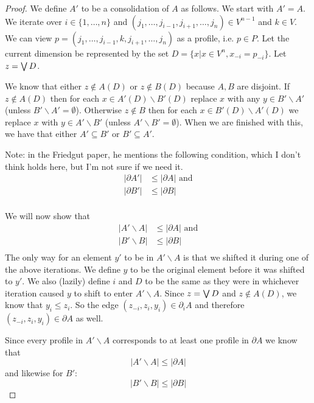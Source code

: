 	\begin{proof}
		We define $A'$ to be a consolidation of $A$ as follows. We start with $A' = A$. We iterate over $i \in \{1, \ldots, n\}$ and $(j_1, \ldots, j_{i-1}, j_{i+1}, \ldots, j_n) \in V^{n-1}$ and $k \in V$. We can view $p = (j_1, \ldots, j_{i-1}, k, j_{i+1}, \ldots, j_n)$ as a profile, i.e. $p \in P$. Let the current dimension be represented by the set $D = \{x | x \in V^n, x_{-i} = p_{-i}\}$. Let $z = \operatorname{\bigvee} D$.

		We know that either $z \notin A(D)$ or $z \notin B(D)$ because $A, B$ are disjoint. If $z \notin A(D)$ then for each $x \in A'(D) \backslash B'(D)$ replace $x$ with any $y \in B' \backslash A'$ (unless $B' \backslash A' = \emptyset$). Otherwise $z \notin B$ then for each $x \in B'(D) \backslash A'(D)$ we replace $x$ with $y \in A' \backslash B'$ (unless $A' \backslash B' = \emptyset$). When we are finished with this, we have that either $A' \subseteq B'$ or $B' \subseteq A'$.

		Note: in the Friedgut paper, he mentions the following condition, which I don't think holds here, but I'm not sure if we need it.
		\begin{align*}
			|\partial A'| &\le |\partial A| \textrm{ and} \\
			|\partial B'| &\le |\partial B| \\
		\end{align*}

		We will now show that
		\begin{align*}
			|A' \backslash A| &\le |\partial A| \textrm{ and} \\
			|B' \backslash B| &\le |\partial B| \\
		\end{align*}
		The only way for an element $y'$ to be in $A' \backslash A$ is that we shifted it during one of the above iterations. We define $y$ to be the original element before it was shifted to $y'$. We also (lazily) define $i$ and $D$ to be the same as they were in whichever iteration caused $y$ to shift to enter $A' \backslash A$. Since $z = \operatorname{\bigvee} D$ and $z \notin A(D)$, we know that $y_i \le z_i$. So the edge $(z_{-i}, z_i, y_i) \in \partial_i A$ and therefore $(z_{-i}, z_i, y_i) \in \partial A$ as well.

		Since every profile in $A' \backslash A$ corresponds to at least one profile in $\partial A$ we know that
		\[
			|A' \backslash A| \le |\partial A|
		\]
		and likewise for $B'$:
		\[
			|B' \backslash B| \le |\partial B|
		\]


\end{proof}
